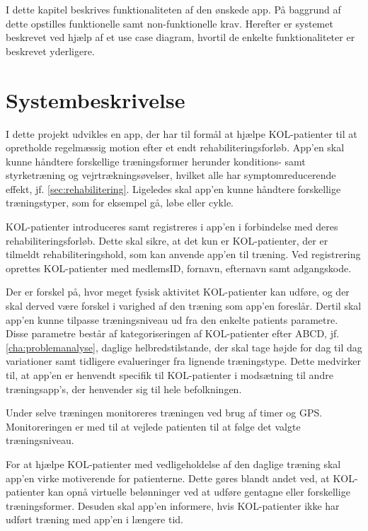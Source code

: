 I dette kapitel beskrives funktionaliteten af den ønskede app. På baggrund af dette opstilles funktionelle samt non-funktionelle krav. Herefter er systemet beskrevet ved hjælp af et use case diagram, hvortil de enkelte funktionaliteter er beskrevet yderligere. 

\section{Systembeskrivelse} \label{sec:systembeskrivelse}
I dette projekt udvikles en app, der har til formål at hjælpe KOL-patienter til at opretholde regelmæssig motion efter et endt rehabiliteringsforløb. App'en skal kunne håndtere forskellige træningsformer herunder konditions- samt styrketræning og vejrtrækningsøvelser, hvilket alle har symptomreducerende effekt, jf. \autoref{sec:rehabilitering}. Ligeledes skal app'en kunne håndtere forskellige træningstyper, som for eksempel gå, løbe eller cykle.

KOL-patienter introduceres samt registreres i app'en i forbindelse med deres rehabiliteringsforløb. 
Dette skal sikre, at det kun er KOL-patienter, der er tilmeldt rehabiliteringshold, som kan anvende app'en til træning. Ved registrering oprettes KOL-patienter med medlemsID, fornavn, efternavn samt adgangskode.  

Der er forskel på, hvor meget fysisk aktivitet KOL-patienter kan udføre, og der skal derved være forskel i varighed af den træning som app'en foreslår. Dertil skal app'en kunne tilpasse træningsniveau ud fra den enkelte patients parametre. Disse parametre består af kategoriseringen af KOL-patienter efter ABCD, jf. \autoref{cha:problemanalyse}, daglige helbredstilstande, der skal tage højde for dag til dag variationer samt tidligere evalueringer fra lignende træningstype. Dette medvirker til, at app'en er henvendt specifik til KOL-patienter i modsætning til andre træningsapp's, der henvender sig til hele befolkningen. 

Under selve træningen monitoreres træningen ved brug af timer og GPS. Monitoreringen er med til at vejlede patienten til at følge det valgte træningsniveau. 

For at hjælpe KOL-patienter med vedligeholdelse af den daglige træning skal app’en virke motiverende for patienterne. Dette gøres blandt andet ved, at KOL-patienter kan opnå virtuelle belønninger ved at udføre gentagne eller forskellige træningsformer. Desuden skal app'en informere, hvis KOL-patienter ikke har udført træning med app'en i længere tid. \citep{Gade2007, Tricomi2016}

